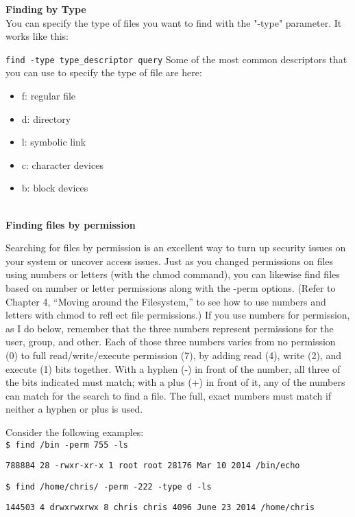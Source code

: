 \documentclass[a4paper,11pt,spanish]{article} %
\begin{document}
\textbf{Finding by Type}\\
You can specify the type of files you want to find with the "-type" parameter. It works like this:

\texttt{find -type type\_descriptor query}
Some of the most common descriptors that you can use to specify the type of file are here:

\begin{itemize}
 \item f: regular file
 \item d: directory
 \item l: symbolic link
 \item c: character devices
 \item b: block devices
\end{itemize}

\cite{digitalocean}\\

\textbf{Finding files by permission}

Searching for files by permission is an excellent way to turn up security issues on your
system or uncover access issues. Just as you changed permissions on files using numbers
or letters (with the chmod command), you can likewise find files based on number or
letter permissions along with the -perm options. (Refer to Chapter 4, “Moving around the
Filesystem,” to see how to use numbers and letters with chmod to refl ect file permissions.)
If you use numbers for permission, as I do below, remember that the three numbers represent
permissions for the user, group, and other. Each of those three numbers varies from no
permission (0) to full read/write/execute permission (7), by adding read (4), write (2), and
execute (1) bits together. With a hyphen (-) in front of the number, all three of the bits
indicated must match; with a plus (+) in front of it, any of the numbers can match for the
search to find a file. The full, exact numbers must match if neither a hyphen or plus is used.

Consider the following examples:\\

\texttt{\$ find /bin -perm 755 -ls}

\texttt{788884 28 -rwxr-xr-x 1 root root 28176 Mar 10 2014 /bin/echo}

\texttt{\$ find /home/chris/ -perm -222 -type d -ls}

\texttt{144503 4 drwxrwxrwx 8 chris chris 4096 June 23 2014 /home/chris}\\
\end{document}
